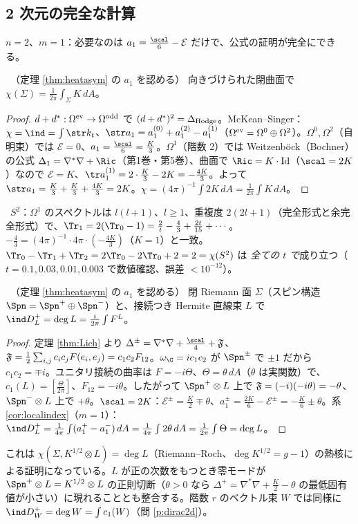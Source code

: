 \subsection{2 次元の完全な計算}
$n=2$、$m=1$：必要なのは $a_1=\frac{\scal}6-\mathcal E$ だけで、公式の証明が完全にできる。
\begin{thm}\label{thm:GBheat}\tP\ （定理 \ref{thm:heatasym} の $a_1$ を認める）
向きづけられた閉曲面で $\chi(\Sigma)=\frac1{2\pi}\int_\Sigma K\,dA$。
\end{thm}
\begin{proof}
$d+d^*:\Omega^{\rm ev}\to\Omega^{\rm odd}$ で $(d+d^*)^2=\Delta_{\rm Hodge}$。McKean--Singer：$\chi=\ind=\int\str k_t$、$\str a_1=a_1^{(0)}+a_1^{(2)}-a_1^{(1)}$（$\Omega^{\rm ev}=\Omega^0\oplus\Omega^2$）。$\Omega^0,\Omega^2$（自明束）では $\mathcal E=0$、$a_1=\frac{\scal}6=\frac K3$。$\Omega^1$（階数 2）では Weitzenböck（Bochner）の公式 $\Delta_1=\nabla^*\nabla+\Ric$（第1巻・第5巻）、曲面で $\Ric=K\cdot\mathrm{Id}$（$\scal=2K$）なので $\mathcal E=K$、$\tr a_1^{(1)}=2\cdot\frac K3-2K=-\frac{4K}3$。よって $\str a_1=\frac K3+\frac K3+\frac{4K}3=2K$。$\chi=(4\pi)^{-1}\int2K\,dA=\frac1{2\pi}\int K\,dA$。
\end{proof}
\begin{rem}[検算]\label{rem:S2heat}\tP\
$S^2$：$\Omega^1$ のスペクトルは $l(l+1)$、$l\ge1$、重複度 $2(2l+1)$（完全形式と余完全形式）で、$\Tr_1=2(\Tr_0-1)=\frac2t-\frac43+\frac{2t}{15}+\cdots$。$-\frac43=(4\pi)^{-1}\cdot4\pi\cdot(-\frac{4K}3)$（$K=1$）と一致。$\Tr_0-\Tr_1+\Tr_2=2\Tr_0-2\Tr_0+2=2=\chi(S^2)$ は \emph{全ての $t$ で}成り立つ（$t=0.1,0.03,0.01,0.003$ で数値確認、誤差 $<10^{-12}$）。
\end{rem}
\begin{thm}[熱核による 2 次元の捻り Dirac 作用素]\label{thm:Dirac2dheat}\tP\ （定理 \ref{thm:heatasym} の $a_1$ を認める）
閉 Riemann 面 $\Sigma$（スピン構造 $\Spn=\Spn^+\oplus\Spn^-$）と、接続つき Hermite 直線束 $L$ で $\ind D_L^+=\deg L=\frac i{2\pi}\int F^L$。
\end{thm}
\begin{proof}
定理 \ref{thm:Lich} より $\Delta^\pm=\nabla^*\nabla+\frac{\scal}4+\frak F$、$\frak F=\frac12\sum_{i,j}c_ic_jF(e_i,e_j)=c_1c_2F_{12}$。$\omega_{\C}=ic_1c_2$ が $\Spn^\pm$ で $\pm1$ だから $c_1c_2=\mp i$。ユニタリ接続の曲率は $F=-i\Theta$、$\Theta=\theta\,dA$（$\theta$ は実関数）で、$c_1(L)=[\frac{\Theta}{2\pi}]$、$F_{12}=-i\theta$。したがって $\Spn^+\otimes L$ 上で $\frak F=(-i)(-i\theta)=-\theta$、$\Spn^-\otimes L$ 上で $+\theta$。$\scal=2K$：$\mathcal E^\pm=\frac K2\mp\theta$、$a_1^\pm=\frac{2K}6-\mathcal E^\pm=-\frac K6\pm\theta$。系 \ref{cor:localindex}（$m=1$）：$\ind D^+_L=\frac1{4\pi}\int(a_1^+-a_1^-)\,dA=\frac1{4\pi}\int2\theta\,dA=\frac1{2\pi}\int\Theta=\deg L$。
\end{proof}
これは $\chi(\Sigma,K^{1/2}\otimes L)=\deg L$（Riemann--Roch、$\deg K^{1/2}=g-1$）の熱核による証明になっている。$L$ が正の次数をもつとき零モードが $\Spn^+\otimes L=K^{1/2}\otimes L$ の正則切断（$\theta>0$ なら $\Delta^+=\nabla^*\nabla+\frac K2-\theta$ の最低固有値が小さい）に現れることとも整合する。階数 $r$ のベクトル束 $W$ では同様に $\ind D_W^+=\deg W=\int c_1(W)$（問 \ref{p:dirac2d}）。

